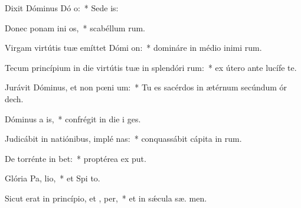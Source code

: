 \item Dixit Dóminus Dó o:~* Sede   is:
\item Donec ponam ini os,~* scabéllum  rum.
\item Virgam virtútis tuæ emíttet Dómi  on:~* domináre in médio inimi rum.
\item Tecum princípium in die virtútis tuæ in splendóri rum:~* ex útero ante lucífe  te.
\item Jurávit Dóminus, et non pœni um:~* Tu es sacérdos in ætérnum secúndum ór dech.
\item Dóminus a  is,~* confrégit in die i  ges.
\item Judicábit in natiónibus, implé nas:~* conquassábit cápita in  rum.
\item De torrénte in  bet:~* proptérea ex put.
\item Glória Pa,  lio,~* et Spi to.
\item Sicut erat in princípio, et ,  per,~* et in sǽcula sæ. men.
